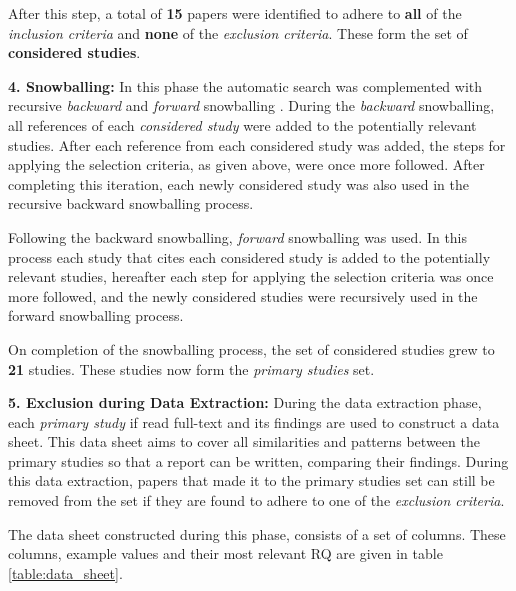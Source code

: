 After this step, a total of \textbf{15} papers were identified to adhere to \textbf{all} of the \textit{inclusion criteria} and \textbf{none} of the \textit{exclusion criteria}. These form the set of \textbf{considered studies}.

\vspace{5mm}

\noindent\textbf{4. Snowballing:}
In this phase the automatic search was complemented with recursive \textit{backward} and \textit{forward} snowballing \cite{wohlin2014snowballing}.
During the \textit{backward} snowballing, all references of each \textit{considered study} were added to the potentially relevant studies. 
After each reference from each considered study was added, the steps for applying the selection criteria, as given above, were once more followed. 
After completing this iteration, each newly considered study was also used in the recursive backward snowballing process.

Following the backward snowballing, \textit{forward} snowballing was used. 
In this process each study that cites each considered study is added to the potentially relevant studies, hereafter each step for applying the selection criteria was once more followed, and the newly considered studies were recursively used in the forward snowballing process.

\vspace{5mm}

On completion of the snowballing process, the set of considered studies grew to \textbf{21} studies. These studies now form the \textit{primary studies} set.

\vspace{5mm}

\noindent\textbf{5. Exclusion during Data Extraction:}
During the data extraction phase, each \textit{primary study} if read full-text and its findings are used to construct a data sheet.
This data sheet aims to cover all similarities and patterns between the primary studies so that a report can be written, comparing their findings.
During this data extraction, papers that made it to the primary studies set can still be removed from the set if they are found to adhere to one of the \textit{exclusion criteria}.

The data sheet constructed during this phase, consists of a set of columns. 
These columns, example values and their most relevant RQ are given in table \ref{table:data_sheet}.


